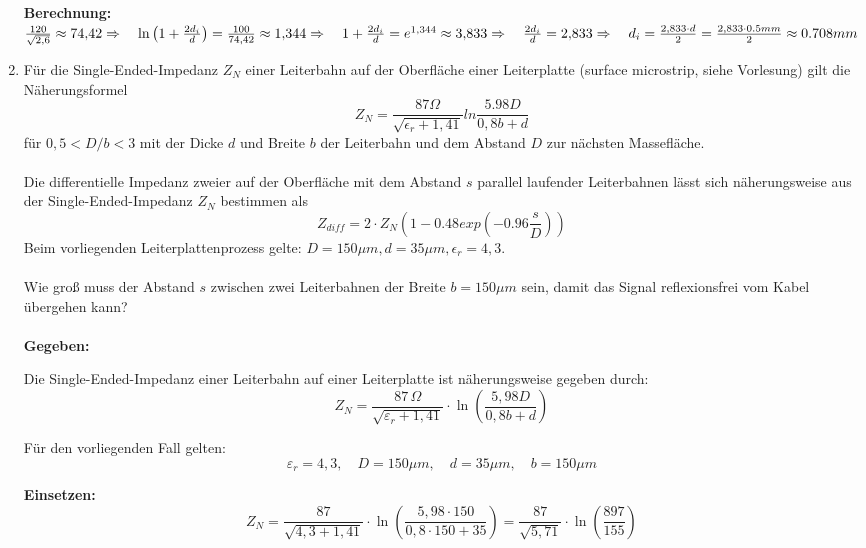 \documentclass[a4paper]{article}
\begin{document}
\begin{enumerate}[label=\alph*)]
    \textbf{Berechnung:}\\
    $
    \frac{120}{\sqrt{2{,}6}} \approx 74{,}42 \\
    \Rightarrow \quad \ln\left(1 + \frac{2d_i}{d} \right) = \frac{100}{74{,}42} \approx 1{,}344 \\
    \Rightarrow \quad 1 + \frac{2d_i}{d} = e^{1{,}344} \approx 3{,}833 \\
    \Rightarrow \quad \frac{2d_i}{d} = 2{,}833 \\
    \Rightarrow \quad d_i = \frac{2{,}833 \cdot d}{2} = \frac{2{,}833 \cdot 0.5mm}{2} \approx 0.708mm
    $\\
    \clearpage
    \item Für die Single-Ended-Impedanz $Z_N$ einer Leiterbahn auf der Oberfläche einer Leiterplatte (surface microstrip, siehe Vorlesung) gilt die Näherungsformel
    \[Z_N=\frac{87 \Omega}{\sqrt{\epsilon_r + 1,41}}ln\frac{5.98D}{0,8b+d}\]
    für $0,5 < D/b < 3$ mit der Dicke $d$ und Breite $b$ der Leiterbahn und dem Abstand $D$ zur nächsten Massefläche.\\\\
    Die differentielle Impedanz zweier auf der Oberfläche mit dem Abstand $s$ parallel laufender Leiterbahnen lässt sich näherungsweise aus der Single-Ended-Impedanz $Z_N$ bestimmen als
    \[Z_{diff}=2\cdot Z_N\left(1-0.48 exp\left(-0.96\frac{s}{D}\right)\right)\]
    Beim vorliegenden Leiterplattenprozess gelte: $D = 150 \mu m, d = 35 \mu m, \epsilon_r = 4,3$.\\\\
    Wie groß muss der Abstand $s$ zwischen zwei Leiterbahnen der Breite $b = 150 \mu m$ sein, damit das Signal reflexionsfrei vom Kabel übergehen kann?\\\\
    \textbf{Gegeben:}

    Die Single-Ended-Impedanz einer Leiterbahn auf einer Leiterplatte ist näherungsweise gegeben durch:
    \[
    Z_N = \frac{87\,\Omega}{\sqrt{\varepsilon_r + 1{,}41}} \cdot \ln\left( \frac{5{,}98D}{0{,}8b + d} \right)
    \]
    
    Für den vorliegenden Fall gelten:
    \[
    \varepsilon_r = 4{,}3, \quad D = 150\mu m, \quad d = 35\mu m, \quad b = 150\mu m
    \]
    
    \textbf{Einsetzen:}
    \[
    Z_N = \frac{87}{\sqrt{4{,}3 + 1{,}41}} \cdot \ln\left( \frac{5{,}98 \cdot 150}{0{,}8 \cdot 150 + 35} \right)
    = \frac{87}{\sqrt{5{,}71}} \cdot \ln\left( \frac{897}{155} \right)
    \]
    

\end{enumerate}
\end{document}
